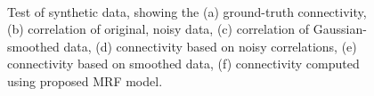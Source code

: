 \documentclass[runningheads,a4paper]{llncs}
\begin{document}
\begin{figure}[tbh] \centering {}  \\   
  \caption[Test on synthetic data.]{Test of synthetic data, showing
the (a) ground-truth connectivity, (b) correlation of original, noisy
data, (c) correlation of Gaussian-smoothed data, (d) connectivity
based on noisy correlations, (e) connectivity based on smoothed data,
(f) connectivity computed using proposed MRF model.}
  \label{fig:1}
\end{figure}
\end{document}
